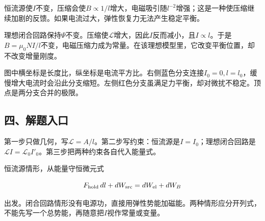 \documentclass[12pt,a4paper,fontset=fandol]{ctexart}
\begin{document}
恒流源使\(I\)不变，压缩会使\(B\propto1/l\)增大，电磁吸引随\(l^{-2}\)增强；这是一种使压缩继续加剧的反馈。如果电流过大，弹性恢复力无法产生稳定平衡。

理想闭合回路保持\(\Psi\)不变。压缩使\(\mathcal L\)增大，因此\(I\)反而减小，且\(I\propto l\)。于是\(B=\mu_0NI/l\)不变，电磁压缩力成为常量。在该理想模型里，它改变平衡位置，却不改变增量刚度。

\begin{center}
\begin{minipage}{\linewidth}
\centering\begingroup{}
\ifdim\wd\diagrambox>.88\linewidth
\sbox{\diagrambox}{\resizebox{.88\linewidth}{!}{\usebox{\diagrambox}}}\fi
\ifdim\ht\diagrambox>.38\textheight
\resizebox{!}{.38\textheight}{\usebox{\diagrambox}}
\else\usebox{\diagrambox}\fi
\par{}\endgroup\end{minipage}\end{center}

图中横坐标是长度比，纵坐标是电流平方比。右侧蓝色分支连接\(I_0=0,l=l_0\)，缓慢增大电流时会沿此分支缩短。左侧红色分支虽满足力平衡，却对微扰不稳定。顶点是两分支合并的极限。

\subsection{四、解题入口}\label{ux56dbux89e3ux9898ux5165ux53e3-1}

第一步只做几何，写\(\mathcal L=A/l\)。第二步写约束：恒流源是\(I=I_0\)；理想闭合回路是\(\mathcal LI=\mathcal L_0I'_0\)。第三步把两种约束各自代入能量式。

恒流源情形，从能量守恒微元式

\[
F_{\rm hold}\,dl+dW_{\rm src}
=dW_{\rm el}+dW_B
\]

出发。闭合回路情形没有电源功，直接用弹性势能加磁能。两种情形应分开列式，不能先写一个总势能，再随意把\(I\)视作常量或变量。
\end{document}
